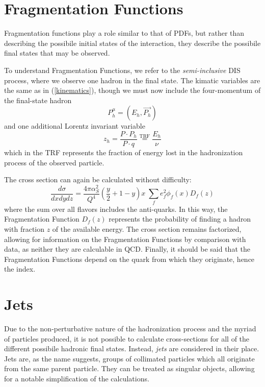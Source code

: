 \documentclass[10pt,a4paper]{book}
\begin{document}
\section{Fragmentation Functions}
Fragmentation functions play a role similar to that of PDFs, but rather than describing the possibile initial states of the interaction, they describe the possibile final states that may be observed.

To understand Fragmentation Functions, we refer to the \emph{semi-inclusive} DIS process, where we observe one hadron in the final state. The kimatic variables are the same as in (\ref{kinematics}), though we must now include the four-momentum of the final-state hadron
\begin{equation}
P_h^\mu = (E_h, \vec{P_h})
\end{equation} 
and one additional Lorentz invariant variable
\begin{equation}
z_h = \frac{P \cdot P_h}{P \cdot q} \overset{\mathrm{TRF}}{=} \frac{E_h}{\nu}
\end{equation}
which in the TRF represents the fraction of energy lost in the hadronization process of the observed particle. 

The cross section can again be calculated without difficulty:
\begin{equation}
\frac{d\sigma}{dx dy dz} = \frac{4\pi\alpha^2_S}{Q^4}\left(\frac{y}{2} + 1 - y\right)x \; \sum_f e_f^2 \phi_f(x) D_f(z)
\label{cross section FF}
\end{equation}
where the sum over all flavors includes the anti-quarks. In this way, the Fragmentation Function $D_f(z)$ represents the probability of finding a hadron with fraction $z$ of the available energy. The cross section remains factorized, allowing for information on the Fragmentation Functions by comparison with data, as neither they are calculable in QCD. Finally, it should be said that the Fragmentation Functions depend on the quark from which they originate, hence the index. 

\section{Jets}
Due to the non-perturbative nature of the hadronization process and the myriad of particles produced, it is not possible to calculate cross-sections for all of the different possibile hadronic final states. Instead, \emph{jets} are considered in their place. Jets are, as the name suggests, groups of collimated particles which all originate from the same parent particle. They can be treated as singular objects, allowing for a notable simplification of the calculations. 
\end{document}
